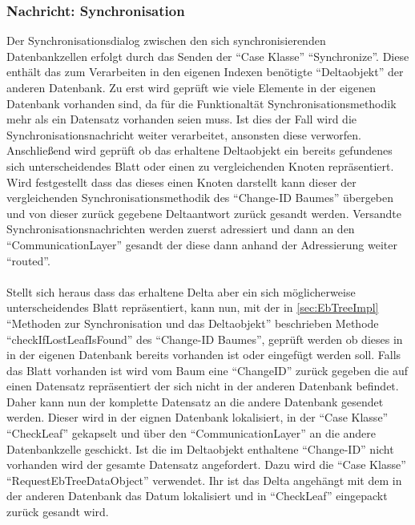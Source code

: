 \documentclass[a4paper,11pt,oneside,%
headsepline,												%
footsepline,												%
bibtotocnumbered									%
]{scrreprt}
\begin{document}
\subsubsection{Nachricht: Synchronisation}
Der Synchronisationsdialog zwischen den sich synchronisierenden Datenbankzellen erfolgt durch das Senden der \enquote{Case Klasse} \enquote{Synchronize}. Diese enthält das zum Verarbeiten in den eigenen Indexen benötigte \enquote{Deltaobjekt} der anderen Datenbank. Zu erst wird geprüft wie viele Elemente in der eigenen Datenbank vorhanden sind, da für die Funktionaltät Synchronisationsmethodik mehr als ein Datensatz vorhanden seien muss. Ist dies der Fall wird die Synchronisationsnachricht weiter verarbeitet, ansonsten diese verworfen. Anschließend wird geprüft ob das erhaltene Deltaobjekt ein bereits gefundenes sich unterscheidendes Blatt oder einen zu vergleichenden Knoten repräsentiert. Wird festgestellt dass das dieses einen Knoten darstellt kann dieser der vergleichenden Synchronisationsmethodik des \enquote{Change-ID Baumes} übergeben und  von dieser zurück gegebene Deltaantwort zurück gesandt werden. Versandte Synchronisationsnachrichten werden zuerst adressiert und dann an den \enquote{CommunicationLayer} gesandt der diese dann anhand der Adressierung weiter \enquote{routed}. \\\\
Stellt sich heraus dass das erhaltene Delta aber ein sich möglicherweise unterscheidendes Blatt repräsentiert, kann nun, mit der in \autoref{sec:EbTreeImpl} \enquote{Methoden zur Synchronisation und das Deltaobjekt} beschrieben Methode \enquote{checkIfLostLeafIsFound} des \enquote{Change-ID Baumes}, geprüft werden ob dieses in in der eigenen Datenbank bereits vorhanden ist oder eingefügt werden soll. Falls das Blatt vorhanden ist wird vom Baum eine \enquote{ChangeID} zurück gegeben die auf einen Datensatz repräsentiert der sich nicht in der anderen Datenbank befindet. Daher kann nun der komplette Datensatz an die andere Datenbank gesendet werden. Dieser wird in der eignen Datenbank lokalisiert, in der \enquote{Case Klasse} \enquote{CheckLeaf} gekapselt und über den \enquote{CommunicationLayer} an die andere Datenbankzelle geschickt.
Ist die im Deltaobjekt enthaltene \enquote{Change-ID} nicht vorhanden wird der gesamte Datensatz angefordert. Dazu wird die \enquote{Case Klasse} \enquote{RequestEbTreeDataObject} verwendet. Ihr ist das Delta angehängt mit dem in der anderen Datenbank das Datum lokalisiert und in \enquote{CheckLeaf} eingepackt zurück gesandt wird.\\\\
\end{document}
